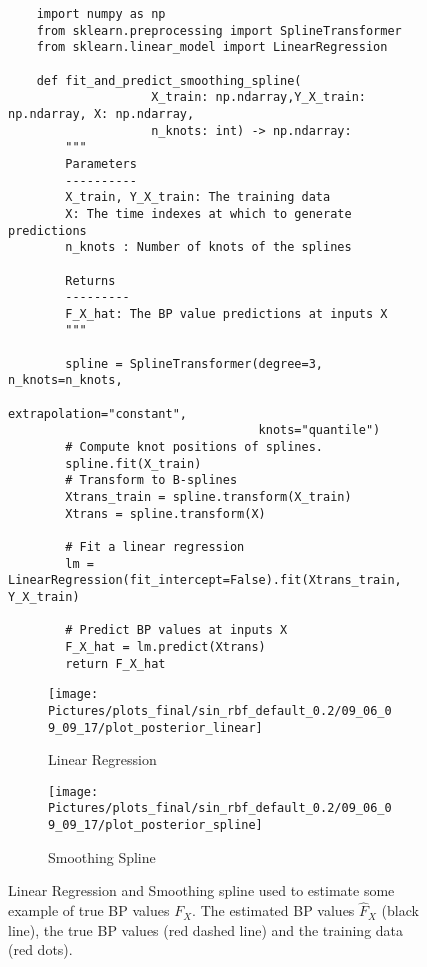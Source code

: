 %
\begin{figure}[!ht]
\centering

\begin{verbatim}
    import numpy as np
    from sklearn.preprocessing import SplineTransformer
    from sklearn.linear_model import LinearRegression

    def fit_and_predict_smoothing_spline(
                    X_train: np.ndarray,Y_X_train: np.ndarray, X: np.ndarray,
                    n_knots: int) -> np.ndarray:
        """
        Parameters
        ----------
        X_train, Y_X_train: The training data
        X: The time indexes at which to generate predictions
        n_knots : Number of knots of the splines

        Returns
        ---------
        F_X_hat: The BP value predictions at inputs X
        """

        spline = SplineTransformer(degree=3, n_knots=n_knots,
                                   extrapolation="constant",
                                   knots="quantile")
        # Compute knot positions of splines.
        spline.fit(X_train)
        # Transform to B-splines
        Xtrans_train = spline.transform(X_train)
        Xtrans = spline.transform(X)

        # Fit a linear regression
        lm = LinearRegression(fit_intercept=False).fit(Xtrans_train, Y_X_train)

        # Predict BP values at inputs X
        F_X_hat = lm.predict(Xtrans)
        return F_X_hat

\end{verbatim}
\end{figure} \label{code:smoothing-spline}



\begin{figure}[!ht]
\centering
\begin{subfigure}{.5\textwidth}
    \centering
    \texttt{[image: 
        Pictures/plots\_final/sin\_rbf\_default\_0.2/09\_06\_09\_09\_17/plot\_posterior\_linear]}
    \caption{Linear Regression}
    \label{fig:post-linear}
\end{subfigure}\hfill
\begin{subfigure}{.5\textwidth}
    \centering
    \texttt{[image: 
        Pictures/plots\_final/sin\_rbf\_default\_0.2/09\_06\_09\_09\_17/plot\_posterior\_spline]}
    \caption{Smoothing Spline}
    \label{fig:post-spline}
\end{subfigure}
\caption{Linear Regression and Smoothing spline used
to estimate some example of true BP values $F_X$. The estimated BP values $\hat{F}_X$ (black line), the
        true BP values (red dashed line) and the training data (red dots).}
\label{fig:regression-example}
\end{figure}


